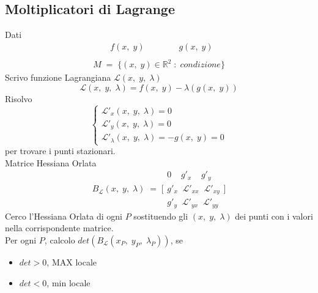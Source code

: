 \documentclass[a4paper, 10pt]{article}
\begin{document}
			\subsection{Moltiplicatori di Lagrange}
				Dati
					\[
						\begin{array}{l}
							\quad\quad f(x,\; y)\quad\quad\quad\quad g(x,\; y) \\
							\\
							M\; =\; \{ (x,\; y) \in \mathbb{R}^2\; :\; condizione \}
						\end{array}
					\]
				Scrivo funzione Lagrangiana $ \mathcal{L}(x,\; y,\; \lambda) $
					\[
						\mathcal{L}(x,\; y,\; \lambda) = f(x,\; y) - \lambda(g(x,\; y))
					\]
				Risolvo
					\[ 
						\begin{cases} 
							\mathcal{L}'_x(x,\; y,\; \lambda) = 0 \\
							\mathcal{L}'_y(x,\; y,\; \lambda) = 0 \\
							\mathcal{L}'_\lambda(x,\; y,\; \lambda) = -g(x,\; y) = 0
						\end{cases} 
					\]
				per trovare i punti stazionari.\\
				Matrice Hessiana Orlata
					\[
						B_\mathcal{L}(x,\; y,\; \lambda)\; =\; \Biggl[
							\begin{array}{l}
								0\;\;\;\; g'_x\;\;\;\; g'_y \\
								g'_x\;\; \mathcal{L}'_{xx}\;\; \mathcal{L}'_{xy} \\
								g'_y\;\; \mathcal{L}'_{yx}\;\; \mathcal{L}'_{yy}
							\end{array}
						\Biggl]
					\]
				Cerco l'Hessiana Orlata di ogni $ P $ sostituendo gli $ (x,\; y,\; \lambda) $ dei punti con i valori nella corrispondente matrice.\\
				Per ogni $ P $, calcolo $ det(B_\mathcal{L}(x_P,\; y_P,\; \lambda_P)) $, se
					\begin{itemize}
						\item $ det > 0 $, MAX locale
						\item $ det < 0 $, min locale
					\end{itemize}
				
\end{document}

